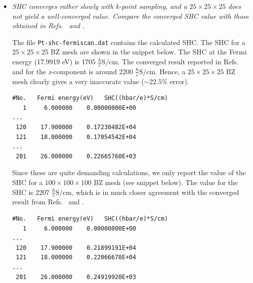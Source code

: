 \begin{itemize}
	\item {\it SHC converges rather slowly with k-point sampling, and a $25 \times 25 \times 25$ does not yield a well-converged value.
	Compare the converged SHC value with those obtained in Refs.~ and .}

	The file {\tt Pt-shc-fermiscan.dat} contains the calculated SHC. The SHC for a $25\times25\times25$ BZ mesh are shown in the snippet below. The SHC 
	at the Fermi energy (17.9919 eV) is 1705 $\frac{\hbar}{e}\mathrm{S/cm}$. 
	The converged result reported in Refs.~ and  for the \textit{z}-component is around 2200 $\frac{\hbar}{e}\mathrm{S/cm}$. Hence, a $25\times25\times25$ BZ mesh clearly gives a very inaccurate value ($\sim 22.5\%$ error).   

\begin{tcolorbox}[title=$25\times25\times25$ kmesh,sharp corners,boxrule=0.5pt]
{\small
\begin{verbatim}
#No.   Fermi energy(eV)   SHC((hbar/e)*S/cm)
   1     6.000000    0.00000000E+00
...
 120    17.900000    0.17230482E+04
 121    18.000000    0.17054542E+04
...
 201    26.000000    0.22665760E+03
\end{verbatim}
}
\end{tcolorbox}

Since these are quite demanding calculations, we only report the value of the SHC for a $100\times100\times100$ BZ mesh (see snippet below). The value for the SHC is 2207 $\frac{\hbar}{e}\mathrm{S/cm}$, which is in much closer agreement with the converged result from Refs.~ and .

\begin{tcolorbox}[title=$100\times100\times100$ kmesh,sharp corners,boxrule=0.5pt]
{\small
\begin{verbatim}
#No.   Fermi energy(eV)   SHC((hbar/e)*S/cm)
   1     6.000000    0.00000000E+00
...
 120    17.900000    0.21899191E+04
 121    18.000000    0.22066678E+04
...
 201    26.000000    0.24919920E+03
\end{verbatim}
}
\end{tcolorbox}


\end{itemize}
